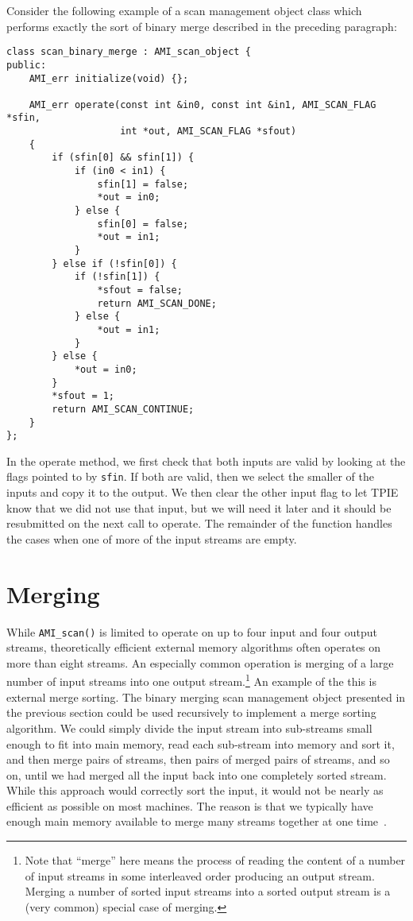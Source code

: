 Consider the following example of a scan management object class which
performs exactly the sort of binary
merge described in the
preceding paragraph:

\begin{verbatim}
class scan_binary_merge : AMI_scan_object {
public:
    AMI_err initialize(void) {};
    
    AMI_err operate(const int &in0, const int &in1, AMI_SCAN_FLAG *sfin,
                    int *out, AMI_SCAN_FLAG *sfout) 
    {
        if (sfin[0] && sfin[1]) {
            if (in0 < in1) {
                sfin[1] = false;
                *out = in0;
            } else {
                sfin[0] = false;
                *out = in1;
            }
        } else if (!sfin[0]) {
            if (!sfin[1]) {
                *sfout = false;
                return AMI_SCAN_DONE;
            } else {
                *out = in1;
            }
        } else {
            *out = in0;
        }
        *sfout = 1;
        return AMI_SCAN_CONTINUE;
    }
};
\end{verbatim}

In the operate method, we first check that both inputs are valid by
looking at the flags pointed to by \verb|sfin|.  If both are valid,
then we select the smaller of the inputs and copy it to the output.
We then clear the other input flag to let TPIE know that we did not
use that input, but we will need it later and it should be resubmitted
on the next call to operate. The remainder of the function handles
the cases when one of more of the input streams are empty.


\section{Merging} \label{sec:merging}

While \verb|AMI_scan()| is limited to operate on up to four input and four
output streams, theoretically efficient external memory algorithms often
operates on more than eight streams. An especially common operation is
merging of a large number of input streams into one output
stream.\footnote{Note that ``merge'' here means the process of reading the
content of a number of input streams in some interleaved order producing an
output stream. Merging a number of sorted input streams into a sorted
output stream is a (very common) special case of merging.} An example of
the this is external merge sorting. The binary merging scan management
object presented in the previous section could be used recursively to
implement a merge sorting algorithm. We could
simply divide the input stream into sub-streams small enough to fit into
main memory, read each sub-stream into memory and sort it, and then merge
pairs of streams, then pairs of merged pairs of streams, and so on, until
we had merged all the input back into one completely sorted stream. While
this approach would correctly sort the input, it would not be nearly as
efficient as possible on most machines. The reason is that we typically
have enough main memory available to merge many streams together at one
time~\cite{aggarwal:input}.

